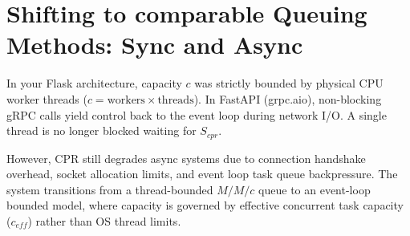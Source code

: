 \documentclass{article}
\begin{document}
\section{Shifting to comparable Queuing Methods: Sync and Async}

In your Flask architecture, capacity $c$ was strictly bounded by physical CPU worker threads ($c = \text{workers} \times \text{threads}$). In FastAPI (grpc.aio), non-blocking gRPC calls yield control back to the event loop during network I/O. A single thread is no longer blocked waiting for $S_{cpr}$.

However, CPR still degrades async systems due to connection handshake overhead, socket allocation limits, and event loop task queue backpressure. The system transitions from a thread-bounded $M/M/c$ queue to an event-loop bounded model, where capacity is governed by effective concurrent task capacity ($c_{eff}$) rather than OS thread limits.
\end{document}
